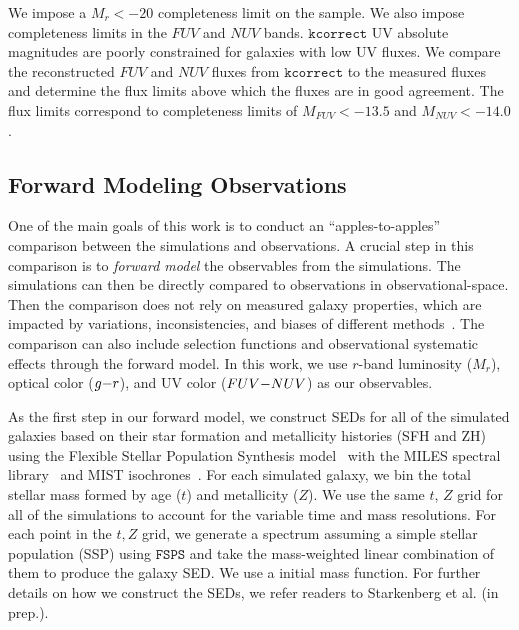 We impose a $M_r < -20$ completeness limit on the \cite{tinker2011} sample.
We also impose completeness limits in the $FUV$ and $NUV$ bands. 
$\mathtt{kcorrect}$ UV absolute magnitudes are poorly constrained for
galaxies with low UV fluxes. 
We compare the reconstructed $FUV$ and $NUV$ fluxes from
$\mathtt{kcorrect}$ to the measured fluxes and determine the flux limits
above which the fluxes are in good agreement. 
The flux limits correspond to completeness limits of $M_{FUV} < -13.5$  and
$M_{NUV} < -14.0$. 

\subsection{Forward Modeling Observations} \label{sec:fm} 
One of the main goals of this work is to conduct an ``apples-to-apples''
comparison between the simulations and observations. 
A crucial step in this comparison is to \emph{forward model} the
observables from the simulations. 
The simulations can then be directly compared to observations in
observational-space. 
Then the comparison does not rely on measured galaxy properties,
which are impacted by variations, inconsistencies, and biases of different
methods~\citep{dickey2020}. 
The comparison can also include selection functions and observational systematic
effects through the forward model. 
In this work, we use $r$-band luminosity ($M_r$), optical color ($g{-}r$),
and UV color ($FUV{-}NUV$) as our observables. 

As the first step in our forward model, we construct SEDs for all
of the simulated galaxies based on their star formation and metallicity
histories (SFH and ZH) using the Flexible Stellar Population Synthesis
model~\citep[$\mathtt{FSPS}$;][]{conroy2009, conroy2010} with the MILES
spectral library~\citep{sanchez_blazquez2006} and MIST
isochrones~\citep{paxton2011, paxton2013, paxton2015, choi2016, dotter2016}.
For each simulated galaxy, we bin the total stellar mass formed by age ($t$) and metallicity
($Z$). We use the same $t$, $Z$ grid for all of the simulations
to account for the variable time and mass resolutions. For each point in the
$t, Z$ grid, we generate a spectrum assuming a simple stellar population (SSP)
using $\mathtt{FSPS}$ and take the mass-weighted linear combination of them to
produce the galaxy SED. We use a
\cite{chabrier2003} initial mass function. For further details on how we
construct the SEDs, we refer readers to Starkenberg et al. (in prep.).

